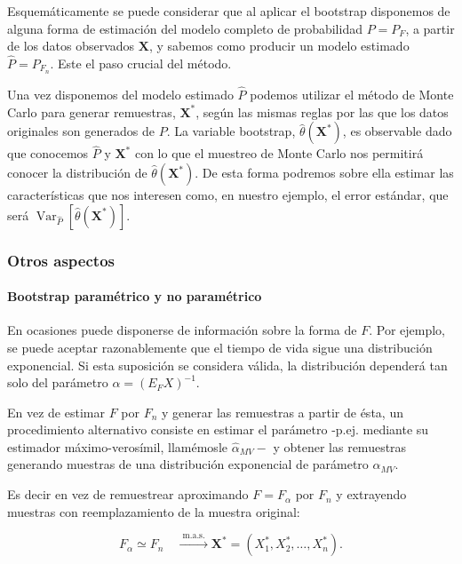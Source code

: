 \documentclass[
]{article}
\begin{document}
Esquemáticamente se puede considerar que al aplicar el bootstrap disponemos de alguna forma de estimación del modelo completo de probabilidad \(P=P_{F}\), a partir de los datos observados \(\mathbf{X}\), y sabemos como producir un modelo estimado \(\hat{P}=P_{F_{n}}\). Este el paso crucial del método.

Una vez disponemos del modelo estimado \(\hat{P}\) podemos utilizar el método de Monte Carlo para generar remuestras, \(\mathbf{X}^{*}\), según las mismas reglas por las que los datos originales son generados de \(P\). La variable bootstrap, \(\hat{\theta}\left(\mathbf{X}^{*}\right)\), es observable dado que conocemos \(\hat{P}\) y \(\mathbf{X}^{*}\) con lo que el muestreo de Monte Carlo nos permitirá conocer la distribución de \(\hat{\theta}\left(\mathbf{X}^{*}\right)\). De esta forma podremos sobre ella estimar las características que nos interesen como, en nuestro ejemplo, el error estándar, que será \(\operatorname{Var}_{\hat{P}}\left[\hat{\theta}\left(\mathbf{X}^{*}\right)\right]\).

\subsubsection{Otros aspectos}\label{otros-aspectos}

\paragraph{Bootstrap paramétrico y no paramétrico}\label{bootstrap-paramuxe9trico-y-no-paramuxe9trico}

En ocasiones puede disponerse de información sobre la forma de \(F\). Por ejemplo, se puede aceptar razonablemente que el tiempo de vida sigue una distribución exponencial. Si esta suposición se considera válida, la distribución dependerá tan solo del parámetro \(\alpha=\left(E_{F} X\right)^{-1}\).

En vez de estimar \(F\) por \(F_{n}\) y generar las remuestras a partir de ésta, un procedimiento alternativo consiste en estimar el parámetro -p.ej. mediante su estimador máximo-verosímil, llamémosle \(\hat{\alpha}_{M V}-\) y obtener las remuestras generando muestras de una distribución exponencial de parámetro \(\hat{\alpha}_{M V}\).

Es decir en vez de remuestrear aproximando \(F=F_{\alpha}\) por \(F_{n}\) y extrayendo muestras con reemplazamiento de la muestra original:

\[
F_{\alpha} \simeq F_{n} \quad \xrightarrow{\text { m.a.s. }} \mathbf{X}^{*}=\left(X_{1}^{*}, X_{2}^{*}, \ldots, X_{n}^{*}\right) .
\]
\end{document}
